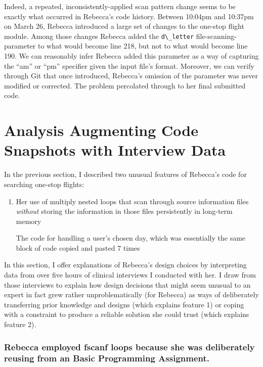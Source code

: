 Indeed, a repeated, inconsistently-applied scan pattern change seems to be exactly what occurred in Rebecca's code history. Between 10:04pm and 10:37pm on March 26, Rebecca introduced a large set of changes to the one-stop flight module. Among those changes Rebecca added the \texttt{d\textbackslash{}\_letter} file-scanning-parameter to what would become line 218, but not to what would become line 190. We can reasonably infer Rebecca added this parameter as a way of capturing the ``am'' or ``pm'' specifier given the input file's format. Moreover, we can verify through Git that once introduced, Rebecca's omission of the parameter was never modified or corrected. The problem percolated through to her final submitted code.

\section{Analysis Augmenting Code Snapshots with Interview Data}\label{analysis-augmenting-code-snapshots-with-interview-data}

In the previous section, I described two unusual features of Rebecca's code for searching one-stop flights:

\begin{enumerate}
\def\labelenumi{\arabic{enumi}.}
\item
  Her use of multiply nested loops that scan through source information files \emph{without} storing the information in those files persistently in long-term memory

  The code for handling a user's chosen day, which was essentially the same block of code copied and pasted 7 times
\end{enumerate}

In this section, I offer explanations of Rebecca's design choices by interpreting data from over five hours of clinical interviews I conducted with her. I draw from those interviews to explain how design decisions that might seem unusual to an expert in fact grew rather unproblematically (for Rebecca) as ways of deliberately transferring prior knowledge and designs (which explains feature 1) or coping with a constraint to produce a reliable solution she could trust (which explains feature 2).

\subsubsection{Rebecca employed fscanf loops because she was deliberately reusing from an Basic Programming Assignment.}\label{rebecca-employed-fscanf-loops-because-she-was-deliberately-reusing-from-an-basic-programming-assignment.}

